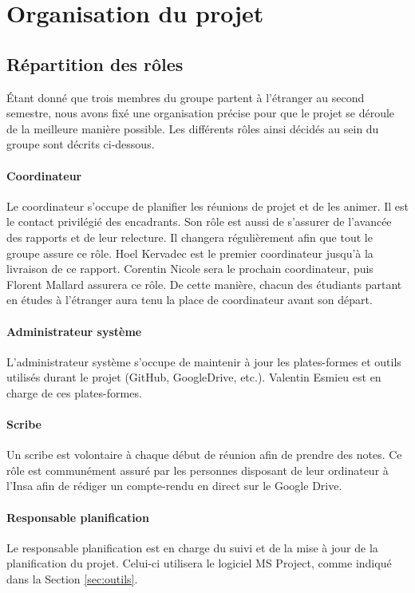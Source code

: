 \section{Organisation du projet}
	\subsection{Répartition des rôles}
	    Étant donné que trois membres du groupe partent à l'étranger au second semestre, nous avons fixé une organisation précise pour que le projet se déroule de la meilleure manière possible. Les différents rôles ainsi décidés au sein du groupe sont décrits ci-dessous.
	    
	    \paragraph{Coordinateur} Le coordinateur s'occupe de planifier les réunions de projet et de les animer. Il est le contact privilégié des encadrants. Son rôle est aussi de s'assurer de l'avancée des rapports et de leur relecture. Il changera régulièrement afin que tout le groupe assure ce rôle. Hoel Kervadec est le premier coordinateur jusqu'à la livraison de ce rapport. Corentin Nicole sera le prochain coordinateur, puis Florent Mallard assurera ce rôle. De cette manière, chacun des étudiants partant en études à l'étranger aura tenu la place de coordinateur avant son départ.
	    
	    \paragraph{Administrateur système} L'administrateur système s'occupe de maintenir à jour les plates-formes et outils utilisés durant le projet (GitHub, GoogleDrive, etc.). Valentin Esmieu est en charge de ces plates-formes.
	    
	    \paragraph{Scribe} Un scribe est volontaire à chaque début de réunion afin de prendre des notes. Ce rôle est communément assuré par les personnes disposant de leur ordinateur à l'{\sc Insa} afin de rédiger un compte-rendu en direct sur le Google Drive.
	    
	    \paragraph{Responsable planification} Le responsable planification est en charge du suivi et de la mise à jour de la planification du projet. Celui-ci utilisera le logiciel MS Project, comme indiqué dans la Section \ref{sec:outils}.
	    
